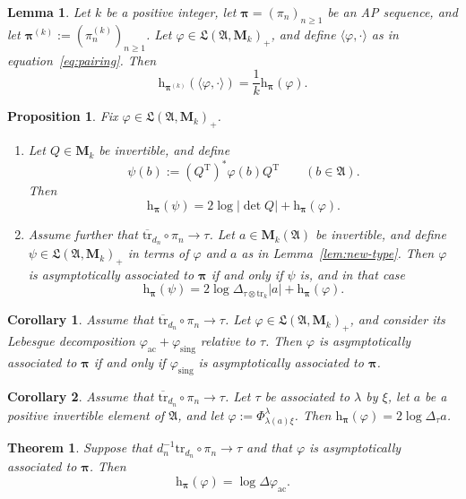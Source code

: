 \documentclass[10pt,a4paper]{amsart}
\newtheorem{mainthm}{Theorem}
\newtheorem{lem}{Lemma}
\newtheorem{prop}{Proposition}
\newtheorem{cor}{Corollary}
\newcommand{\A}{\mathfrak{A}}
\newcommand{\Tr}{\mathrm{tr}}
\newcommand{\bspi}{\boldsymbol{\pi}}
\newcommand{\frL}{\mathfrak{L}}
\renewcommand{\l}{\lambda}
\renewcommand{\phi}{\varphi}
\renewcommand{\rm}[1]{\mathrm{#1}}
\newcommand{\rmM}{\mathbf{M}}
\newcommand{\rmh}{\mathrm{h}}
\newcommand{\tr}{\overline{\mathrm{tr}}}
\begin{document}
\begin{lem}\label{lem:AP-for-pairing}
Let $k$ be a positive integer, let $\bspi = (\pi_n)_{n\ge 1}$ be an AP sequence, and let $\bspi^{(k)} := (\pi_n^{(k)})_{n\ge 1}$.  Let $\phi\in\frL(\A,\rmM_k)_+$, and define $\langle \phi,\cdot\rangle$ as in equation~\eqref{eq:pairing}.  Then
\[\rmh_{\bspi^{(k)}}(\langle \phi,\cdot\rangle) = \frac{1}{k} \rmh_{\bspi}(\phi).\]
\end{lem}

\begin{prop}\label{prop:transform}
Fix $\phi \in \frL(\A,\rmM_k)_+$.
\begin{enumerate}
\item[a.] Let $Q \in \rmM_k$ be invertible, and define
\[\psi(b) := (Q^\rm{T})^\ast \phi(b) Q^\rm{T} \qquad (b \in \A).\]
Then
\[\rmh_{\bspi}(\psi) = 2\log |\det Q| + \rmh_{\bspi}(\phi).\]

\item[b.] Assume further that $\tr_{d_n}\circ \pi_n \to \tau$.  Let $a \in \rmM_k(\A)$ be invertible, and define $\psi \in \frL(\A,\rmM_k)_+$ in terms of $\phi$ and $a$ as in Lemma~\ref{lem:new-type}. Then $\phi$ is asymptotically associated to $\bspi$ if and only if $\psi$ is, and in that case
	\[\rmh_{\bspi}(\psi) = 2\log \Delta_{\tau\otimes \Tr_k}|a| + \rmh_{\bspi}(\phi).\]
\end{enumerate}
\end{prop}

\begin{cor}\label{cor:singular-part-controls}
Assume that $\tr_{d_n}\circ \pi_n \to \tau$.  Let $\phi \in \frL(\A,\rmM_k)_+$, and consider its Lebesgue decomposition $\phi_{\rm{ac}} + \phi_{\rm{sing}}$ relative to $\tau$.  Then $\phi$ is asymptotically associated to $\bspi$ if and only if $\phi_{\rm{sing}}$ is asymptotically associated to $\bspi$.
\end{cor}

\begin{cor}\label{cor:pre-B}
	Assume that $\tr_{d_n}\circ \pi_n \to \tau$.  Let $\tau$ be associated to $\l$ by $\xi$, let $a$ be a positive invertible element of $\A$, and let $\phi := \Phi^\l_{\l(a)\xi}$.  Then $\rmh_{\bspi}(\phi) = 2\log\Delta_\tau a$.
\end{cor}

\begin{mainthm}\label{mainthm:det-form}
Suppose that $d_n^{-1}\Tr_{d_n}\circ \pi_n \to \tau$ and that $\phi$ is asymptotically associated to $\bspi$. Then
\[\rmh_{\bspi}(\phi) = \log \Delta \phi_{\rm{ac}}.\]
\end{mainthm}
\end{document}
